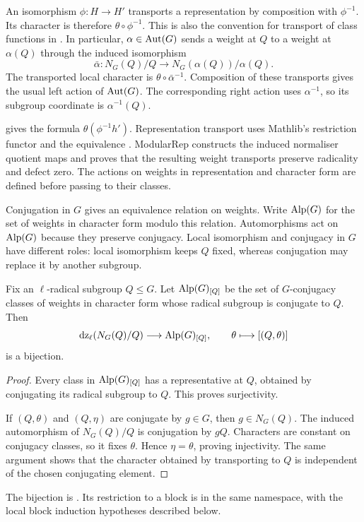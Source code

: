 An isomorphism $\phi:H\to H'$ transports a representation by composition
with $\phi^{-1}$. Its character is therefore $\theta\circ \phi^{-1}$.
This is also the convention for transport of class functions in
\cite[Problem~2.1]{Navarro1998}.
In particular, $\alpha\in\operatorname{Aut}(G)$ sends a weight at $Q$ to a weight at
$\alpha(Q)$ through the induced isomorphism
\[
 \bar\alpha:N_G(Q)/Q\longrightarrow
 N_G(\alpha(Q))/\alpha(Q).
\]
The transported local character is $\theta\circ\bar\alpha^{-1}$.
Composition of these transports gives the usual left action of
$\operatorname{Aut}(G)$. The corresponding right action uses $\alpha^{-1}$, so its
subgroup coordinate is $\alpha^{-1}(Q)$.
\begin{implementation}
gives the formula $\theta(\phi^{-1}h')$.
Representation transport uses Mathlib's restriction functor
 and the equivalence .
ModularRep constructs the induced normaliser quotient maps and proves
that the resulting weight transports preserve radicality and defect zero.
The actions on weights in representation and character form are defined before
passing to their classes.
\end{implementation}

Conjugation in $G$ gives an equivalence relation on weights.
Write $\operatorname{Alp}(G)$ for the set of weights in character form modulo this relation.
Automorphisms act on $\operatorname{Alp}(G)$ because they preserve conjugacy.
Local isomorphism and conjugacy in $G$ have different roles:
local isomorphism keeps $Q$ fixed, whereas conjugation may replace it
by another subgroup.

\begin{proposition}
\label{lib:weights:representative}
Fix an $\ell$-radical subgroup $Q\leq G$. Let $\operatorname{Alp}(G)_{[Q]}$ be the
set of $G$-conjugacy classes of weights in character form whose radical
subgroup is conjugate to $Q$. Then
\[
 \operatorname{dz}_\ell(N_G(Q)/Q)\longrightarrow\operatorname{Alp}(G)_{[Q]},
 \qquad \theta\longmapsto[(Q,\theta)]
\]
is a bijection.
\end{proposition}
\begin{proof}
Every class in $\operatorname{Alp}(G)_{[Q]}$ has a representative at $Q$, obtained
by conjugating its radical subgroup to $Q$. This proves surjectivity.

If $(Q,\theta)$ and $(Q,\eta)$ are conjugate by $g\in G$, then
$g\in N_G(Q)$. The induced automorphism of $N_G(Q)/Q$ is conjugation
by $gQ$. Characters are constant on conjugacy classes, so it fixes
$\theta$. Hence $\eta=\theta$, proving injectivity. The same argument
shows that the character obtained by transporting to $Q$ is
independent of the chosen conjugating element.
\end{proof}
\begin{implementation}
The bijection is
.
Its restriction to a block is
 in the same
namespace, with the local block induction hypotheses described below.
\end{implementation}

